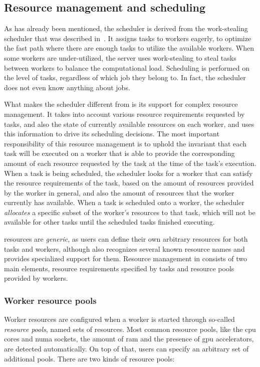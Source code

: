 \subsection{Resource management and scheduling}
\label{sec:hq-resource-management}
As has already been mentioned, the \hyperqueue{} scheduler is derived from the
\rsds{} work-stealing scheduler that was described in~. It
assigns tasks to workers eagerly, to optimize the fast path where there are enough tasks to utilize
the available workers. When some workers are under-utilized, the server uses work-stealing to steal
tasks between workers to balance the computational load. Scheduling is performed on the level of
tasks, regardless of which job they belong to. In fact, the scheduler does not even know anything
about jobs.

What makes the scheduler different from \rsds{} is its support for complex resource
management. It takes into account various resource requirements requested by tasks, and also the
state of currently available resources on each worker, and uses this information to drive its
scheduling decisions. The most important responsibility of this resource management is to uphold
the invariant that each task will be executed on a worker that is able to provide the corresponding
amount of each resource requested by the task at the time of the task's execution. When a task is
being scheduled, the scheduler looks for a worker that can satisfy the resource requirements of the
task, based on the amount of resources provided by the worker in general, and also the amount of
resources that the worker currently has available. When a task is scheduled onto a worker, the
scheduler \emph{allocates} a specific subset of the worker's resources to that task, which
will not be available for other tasks until the scheduled tasks finished executing.

\hyperqueue{} resources are \emph{generic}, as users can define their own
arbitrary resources for both tasks and workers, although \hq{} also recognizes
several known resource names and provides specialized support for them. Resource management in
\hyperqueue{} consists of two main elements, resource requirements specified by tasks and
resource pools provided by workers.

\subsubsection*{Worker resource pools}
Worker resources are configured when a worker is started through so-called \emph{resource pools},
named sets of resources. Most common resource pools, like the \gls{cpu} cores and
\gls{numa} sockets, the amount of \gls{ram} and the presence of
\gls{gpu} accelerators, are detected automatically. On top of that, users can specify
an arbitrary set of additional pools. There are two kinds of resource pools:

